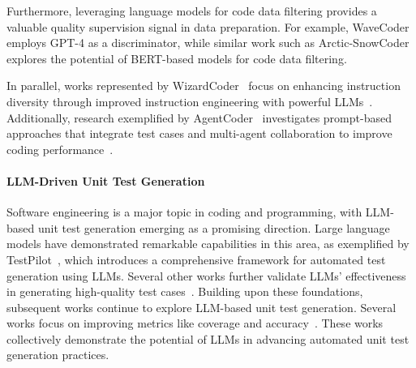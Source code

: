 Furthermore, leveraging language models for code data filtering provides a valuable quality supervision signal in data preparation. For example, WaveCoder~\cite{Yu2023WaveCoderWA} employs GPT-4 as a discriminator, while similar work such as Arctic-SnowCoder~\cite{Arctic-SnowCoder} explores the potential of BERT-based models for code data filtering.

In parallel, 
works represented by WizardCoder~\cite{luo2023wizardcoder} focus on enhancing instruction diversity through improved instruction engineering with powerful LLMs~\cite{Jiang2024ASO,Zan2023CanPL,Zhu2022ASO}.  
Additionally, research exemplified by AgentCoder~\cite{Huang2023AgentCoderMC} investigates prompt-based approaches that integrate test cases and multi-agent collaboration to improve coding performance~\cite{Huang2023AgentCoderMC, chen2022codet, islam2024mapcoder}.



\paragraph{LLM-Driven Unit Test Generation}

Software engineering is a major topic in coding and programming, with LLM-based unit test generation emerging as a promising direction. Large language models have demonstrated remarkable capabilities in this area, as exemplified by TestPilot~\cite{empirical-unittest}, which introduces a comprehensive framework for automated test generation using LLMs. 
Several other works further validate LLMs' effectiveness in generating high-quality test cases~\cite{chatunitest, chattester}.
Building upon these foundations, subsequent works continue to explore LLM-based unit test generation. Several works focus on improving metrics like coverage and accuracy~\cite{Achiam2023GPT4TR, codeaware_prompt, pizzorno2024coverup}. 
These works collectively demonstrate the potential of LLMs in advancing automated unit test generation practices.